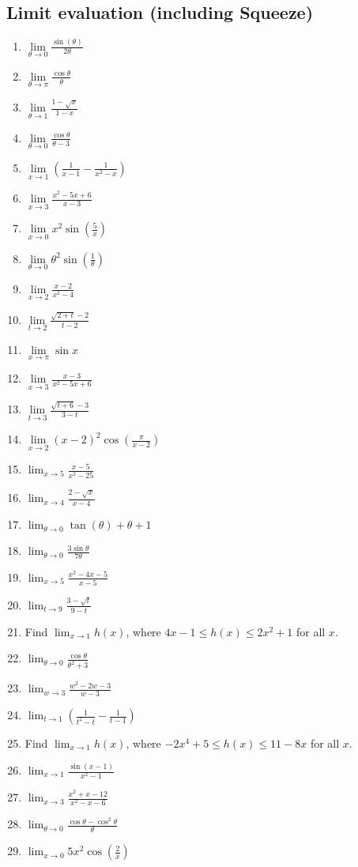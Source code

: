 \documentclass[11pt]{scrartcl}
\begin{document}
\subsection{Limit evaluation (including Squeeze)}
\begin{enumerate}
\item $\lim\limits_{\theta\to0} \frac{\sin(\theta)}{2\theta}$
\item $\lim\limits_{\theta\to\pi}\frac{\cos\theta}{\theta}$
\item $\lim\limits_{\theta\to1} \frac{1-\sqrt x}{1-x}$
\item $\lim\limits_{\theta\to0} \frac{\cos\theta}{\theta-3}$
\item $\lim\limits_{x\to1} \left( \frac{1}{x-1} - \frac{1}{x^2-x} \right)$
\item $\lim\limits_{x\to3} \frac{x^2-5x+6}{x-3}$
\item $\lim\limits_{x\to0} x^2 \sin(\frac{5}{x})$
\item $\lim\limits_{\theta\to0} \theta^2 \sin(\frac{1}{\theta})$
\item $\lim\limits_{x\to2} \frac{x-2}{x^2-4}$
\item $\lim\limits_{t\to2} \frac{\sqrt{2+t} - 2}{t-2}$
\item $\lim\limits_{x\to\pi} \sin x$
\item $\lim\limits_{x\to3} \frac{x-3}{x^2-5x+6}$
\item $\lim\limits_{t\to3} \frac{\sqrt{t+6}-3}{3-t}$
\item $\lim\limits_{x\to2} (x-2)^2 \cos(\frac{\pi}{x-2})$
\item $\lim_{x\to5} \frac{x-5}{x^2-25}$
\item $\lim_{x\to4} \frac{2-\sqrt x}{x-4}$
\item $\lim_{\theta\to0} \tan(\theta) + \theta + 1$
\item $\lim_{\theta\to0} \frac{3\sin\theta}{7\theta}$
\item $\lim_{x\to5} \frac{x^2-4x-5}{x-5}$
\item $\lim_{t\to9}\frac{3-\sqrt t}{9-t}$
\item Find $\lim_{x\to1} h(x)$, where $4x-1 \le h(x) \le 2x^2 + 1$ for all $x$.
\item $\lim_{\theta\to0}\frac{\cos\theta}{\theta^2+3}$
\item $\lim_{w\to3} \frac{w^2-2w-3}{w-3}$
\item $\lim_{t\to1}\left( \frac{1}{t^2-t} - \frac{1}{t-1} \right)$
\item Find $\lim_{x\to1} h(x)$, where $-2x^4 + 5 \le h(x) \le 11-8x$ for all $x$.
\item $\lim_{x\to1} \frac{\sin(x-1)}{x^2 - 1}$
\item $\lim_{x \to 3} \frac{x^2 + x - 12}{x^2 - x - 6}$
\item $\lim_{\theta\to0}  \frac{\cos \theta - \cos^2\theta}{\theta}$
\item $\lim_{x\to0} 5x^2 \cos(\frac2x)$
\end{enumerate}
\end{document}
